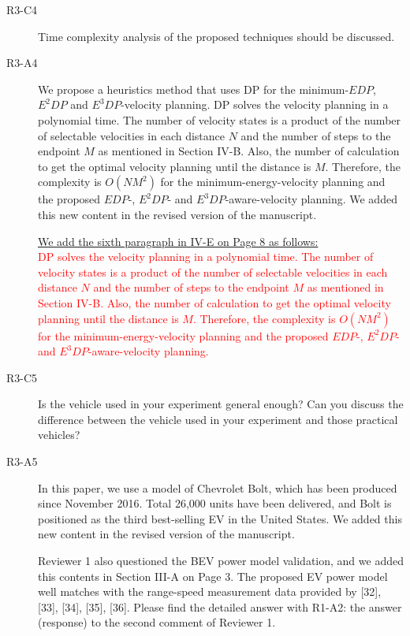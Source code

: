 \documentclass[onecolumn]{IEEEconf}
\begin{document}
\begin{description}
\item [R3-C4] Time complexity analysis of the proposed techniques should be discussed.

\item [R3-A4] We propose a heuristics method that uses DP for the minimum-$EDP$, $E^2DP$ and $E^3DP$-velocity planning. DP solves the velocity planning in a polynomial time. The number of velocity states is a product of the number of selectable velocities in each distance $N$ and the number of steps to the endpoint $M$ as mentioned in Section IV-B. Also, the number of calculation to get the optimal velocity planning until the distance is $M$. Therefore, the complexity is $O(NM^2)$ for the minimum-energy-velocity planning and the proposed $EDP$-, $E^2DP$- and $E^3DP$-aware-velocity planning. We added this new content in the revised version of the manuscript. 
 
\uline{We add the sixth paragraph in IV-E on Page 8 as follows:}\\
\textcolor{red}{DP solves the velocity planning in a polynomial time. The number of velocity states is a product of the number of selectable velocities in each distance $N$ and the number of steps to the endpoint $M$ as mentioned in Section IV-B. Also, the number of calculation to get the optimal velocity planning until the distance is $M$. Therefore, the complexity is $O(NM^2)$ for the minimum-energy-velocity planning and the proposed $EDP$-, $E^2DP$- and $E^3DP$-aware-velocity planning.} 

\item [R3-C5] Is the vehicle used in your experiment general enough? Can you discuss the difference between the vehicle used in your experiment and those practical vehicles?

\item [R3-A5] In this paper, we use a model of Chevrolet Bolt, which has been produced since November 2016. Total 26,000 units have been  delivered, and Bolt is positioned as the third best-selling EV in the United States. We added this new content in the revised version of the manuscript. 

Reviewer 1 also questioned the BEV power model validation, and we added this contents in Section III-A on Page 3. The proposed EV power model well matches with the range-speed measurement data provided by [32], [33], [34], [35], [36]. Please find the detailed answer with R1-A2: the answer (response) to the second comment of Reviewer 1. 


\end{description}
\end{document}
